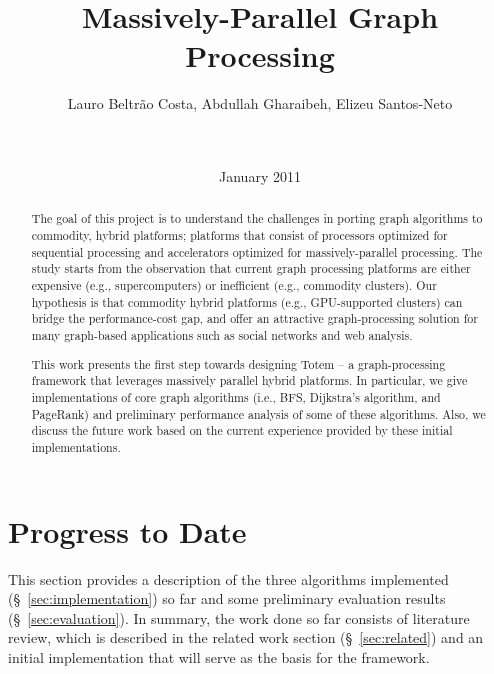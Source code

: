\documentclass{acm_proc_article-sp}[12pt]
\title{Massively-Parallel Graph Processing}
\author{
\alignauthor 
Lauro Beltr\~ao Costa, Abdullah Gharaibeh, Elizeu
Santos-Neto\vspace{3mm}\\
       \affaddr{\small{University of British Columbia}}\\
       \affaddr{\small{2332 Main Mall, Vancouver, BC, CANADA}}\\
       \email{\small{\{lauroc,abdullah,elizeus\}@ece.ubc.ca}}
}
\date{ January 2011}
\newcommand{\comment}[2]{\begin{center}\colorbox{#1}{\parbox{0.85\linewidth}{\textit{{#2}}}}\end{center}}
\newcommand{\abdullah}[1]{\comment{orange}{{Abdullah: #1}}}
\newcommand{\lauro}[1]{\comment{midblue}{{Lauro: #1}}}
\newcommand{\elizeu}[1]{\comment{lightgreen}{{Elizeu: #1}}}
\begin{document}
\maketitle


\begin{abstract}
The goal of this project is to understand the challenges in porting graph algorithms to commodity, hybrid platforms; platforms that consist of processors optimized for sequential processing and accelerators optimized for massively-parallel processing. The study starts from the observation that current graph processing platforms are either expensive (e.g., supercomputers) or inefficient (e.g., commodity clusters). Our hypothesis is that commodity hybrid platforms (e.g., GPU-supported clusters) can bridge the performance-cost gap, and offer an attractive graph-processing solution for many graph-based applications such as social networks and web analysis.

This work presents the first step towards designing {\sc Totem} -- a graph-processing framework that leverages massively parallel hybrid platforms. In particular, we give implementations of core graph algorithms (i.e., BFS, Dijkstra's algorithm, and PageRank) and preliminary performance analysis of some of these algorithms. Also, we discuss the future work based on the current experience provided by these initial implementations.
\end{abstract}







\section{Progress to Date}
\label{sec:progress}

This section provides a description of the three algorithms implemented (\S~\ref{sec:implementation}) so far and some preliminary evaluation results (\S~\ref{sec:evaluation}). In summary, the work done so far consists of literature review, which is described in the related work section (\S~\ref{sec:related}) and an initial implementation that will serve as the basis for the framework.


%






\end{document}
